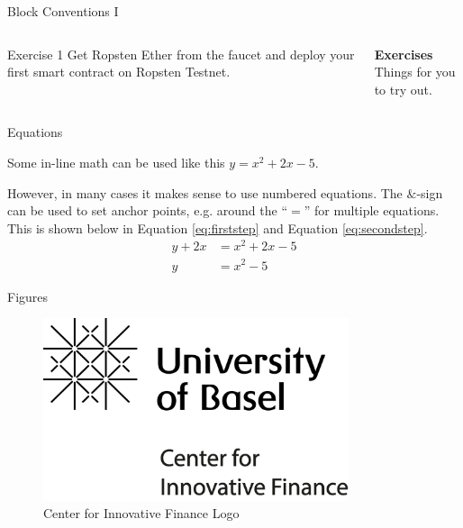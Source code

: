 \documentclass[handout]{beamer}
\begin{document}
\begin{frame}{Block Conventions I}
	\begin{columns}[T]
		\begin{column}{0.45\textwidth}
			\vspace{-1.0em}
			\begin{block}{Exercise 1}
				Get Ropsten Ether from the faucet and deploy your first smart contract on Ropsten Testnet.
			\end{block}		
		\end{column}
		\begin{column}{0.5\textwidth}
		\textbf{Exercises}\\
			Things for you to try out.
		\end{column}
	\end{columns}

\end{frame}



\begin{frame}{Equations}

Some in-line math can be used like this $y=x^2+2x-5$. \\ \vspace{1em}

However, in many cases it makes sense to use numbered equations. The $\&$-sign can be used to set anchor points, e.g. around the ``$=$'' for multiple equations. This is shown below in Equation \eqref{eq:firststep} and Equation \eqref{eq:secondstep}.
	\begin{align}
		y + 2x &= x^2+2x-5 \label{eq:firststep}\\
		y &= x^2-5 \label{eq:secondstep}
	\end{align}
\end{frame}

\begin{frame}{Figures}
	\begin{figure}
		\center
		\includegraphics[width=0.8\textwidth]{../config/logo_cif}	
		\caption{Center for Innovative Finance Logo}
		\label{fig:logo}
	\end{figure}
\end{frame}
\end{document}
